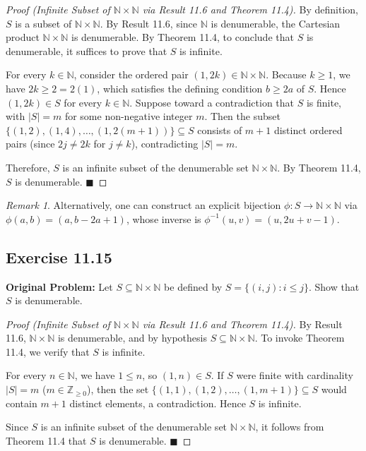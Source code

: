 \documentclass[11pt, letterpaper]{article}
\theoremstyle{definition}
\theoremstyle{remark}
\newtheorem{remark}{Remark}[section]
\begin{document}
\begin{proof}[Proof (Infinite Subset of $\mathbb{N} \times \mathbb{N}$ via Result 11.6 and Theorem 11.4)]
By definition, $S$ is a subset of $\mathbb{N} \times \mathbb{N}$. By Result 11.6, since $\mathbb{N}$ is denumerable, the Cartesian product $\mathbb{N} \times \mathbb{N}$ is denumerable. By Theorem 11.4, to conclude that $S$ is denumerable, it suffices to prove that $S$ is infinite.

For every $k \in \mathbb{N}$, consider the ordered pair $(1, 2k) \in \mathbb{N} \times \mathbb{N}$. Because $k \geq 1$, we have $2k \geq 2 = 2(1)$, which satisfies the defining condition $b \geq 2a$ of $S$. Hence $(1, 2k) \in S$ for every $k \in \mathbb{N}$. Suppose toward a contradiction that $S$ is finite, with $|S| = m$ for some non-negative integer $m$. Then the subset $\{(1, 2), (1, 4), \dots, (1, 2(m+1))\} \subseteq S$ consists of $m + 1$ distinct ordered pairs (since $2j \neq 2k$ for $j \neq k$), contradicting $|S| = m$.

Therefore, $S$ is an infinite subset of the denumerable set $\mathbb{N} \times \mathbb{N}$. By Theorem 11.4, $S$ is denumerable. $\blacksquare$
\end{proof}

\begin{remark}
Alternatively, one can construct an explicit bijection $\phi : S \to \mathbb{N} \times \mathbb{N}$ via $\phi(a, b) = (a, b - 2a + 1)$, whose inverse is $\phi^{-1}(u, v) = (u, 2u + v - 1)$.
\end{remark}

\subsection*{Exercise 11.15}
\textbf{Original Problem:} Let $S \subseteq \mathbb{N} \times \mathbb{N}$ be defined by $S = \{(i, j) : i \leq j\}$. Show that $S$ is denumerable.

\begin{proof}[Proof (Infinite Subset of $\mathbb{N} \times \mathbb{N}$ via Result 11.6 and Theorem 11.4)]
By Result 11.6, $\mathbb{N} \times \mathbb{N}$ is denumerable, and by hypothesis $S \subseteq \mathbb{N} \times \mathbb{N}$. To invoke Theorem 11.4, we verify that $S$ is infinite.

For every $n \in \mathbb{N}$, we have $1 \leq n$, so $(1, n) \in S$. If $S$ were finite with cardinality $|S| = m$ ($m \in \mathbb{Z}_{\geq 0}$), then the set $\{(1, 1), (1, 2), \dots, (1, m + 1)\} \subseteq S$ would contain $m + 1$ distinct elements, a contradiction. Hence $S$ is infinite.

Since $S$ is an infinite subset of the denumerable set $\mathbb{N} \times \mathbb{N}$, it follows from Theorem 11.4 that $S$ is denumerable. $\blacksquare$
\end{proof}
\end{document}
